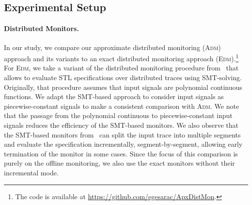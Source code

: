 \documentclass[iicol,lineno]{sn-jnl}
\newcommand{\?}{\text{?}}
\begin{document}
	\subsection{Experimental Setup}
	
	\paragraph*{Distributed Monitors.}
	In our study, we compare our approximate distributed monitoring (\textsc{Adm}) approach and its variants to an exact distributed monitoring approach (\textsc{Edm}).\footnote[1]{The code is available at \url{https://github.com/egesarac/ApxDistMon}.}
	For \textsc{Edm}, we take a variant of the distributed monitoring procedure from~\cite{MomtazAB23} that allows to evaluate STL specifications over distributed traces using SMT-solving.
	Originally, that procedure assumes that input signals are polynomial continuous functions.
	We adapt the SMT-based approach to consider input signals as piecewise-constant signals to make a consistent comparison with \textsc{Adm}.
	We note that the passage from the polynomial continuous to piecewise-constant input signals reduces the efficiency of the SMT-based monitors.
	We also observe that the SMT-based monitors from~\cite{MomtazAB23} can split the input trace into multiple segments and evaluate the specification incrementally, segment-by-segment, allowing early termination of the monitor in some cases.
	Since the focus of this comparison is purely on the offline monitoring, we also use the exact monitors without their incremental mode.
	
\end{document}
